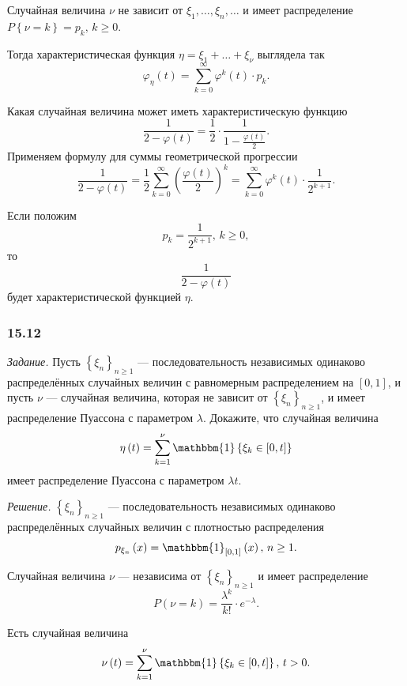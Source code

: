 \begin{enumerate}[label=\alph*)]
Случайная величина $ \nu $ не зависит от $ \xi_1, \dotsc, \xi_n, \dotsc $ и имеет распределение
$P \left\{ \nu = k \right\} = p_k, \,
  k \geq 0$.

Тогда характеристическая функция $ \eta = \xi_1 + \dotsc + \xi_{ \nu }$ выглядела так
$$ \varphi_{ \eta } \left( t \right) =
  \sum \limits_{k = 0}^{ \infty } \varphi^k \left( t \right) \cdot p_k.$$

Какая случайная величина может иметь характеристическую функцию
$$ \frac{1}{2 - \varphi \left( t \right) } =
  \frac{1}{2} \cdot \frac{1}{1 - \frac{ \varphi \left( t \right) }{2}}.$$
Применяем формулу для суммы геометрической прогрессии
$$ \frac{1}{2 - \varphi \left( t \right) } =
  \frac{1}{2}
  \sum \limits_{k = 0}^{ \infty } \left( \frac{ \varphi \left( t \right) }{2} \right)^k =
  \sum \limits_{k = 0}^{ \infty } \varphi^k \left( t \right) \cdot \frac{1}{2^{k+1}}.$$

Если положим
$$p_k = \frac{1}{2^{k+1}}, \,
  k \geq 0,$$
то
$$ \frac{1}{2 - \varphi \left( t \right) }$$
будет характеристической функцией $ \eta $.
\end{enumerate}

\subsubsection*{15.12}

\textit{Задание.}
Пусть $ \left\{ \xi_n \right\}_{n \geq 1}$ ---
последовательность независимых одинаково распределённых случайных величин с равномерным
распределением на $ \left[ 0, 1 \right] $, и пусть $ \nu $ --- случайная величина,
которая не зависит от $ \left\{ \xi_n \right\}_{n \geq 1}$,
и имеет распределение Пуассона с параметром $ \lambda $.
Докажите, что случайная величина
$$ \eta \left( t \right) =
  \sum \limits_{k = 1}^{ \nu } \mathbbm{1} \left\{ \xi_k \in \left[ 0, t \right] \right\} $$
имеет распределение Пуассона с параметром $ \lambda t$.

\textit{Решение.}
$ \left\{ \xi_n \right\}_{n \geq 1}$ ---
последовательность независимых одинаково распределённых случайных величин с плотностью распределения
$$p_{ \xi_n} \left( x \right) = \mathbbm{1}_{ \left[ 0, 1 \right] } \left( x \right), \,
  n \geq 1.$$

Случайная величина $ \nu $ ---
независима от $ \left\{ \xi_n \right\}_{n \geq 1}$ и имеет распределение
$$P \left( \nu = k \right) =
  \frac{ \lambda^k}{k!} \cdot e^{- \lambda }.$$

Есть случайная величина
$$ \nu \left( t \right) =
  \sum \limits_{k = 1}^{ \nu } \mathbbm{1} \left\{ \xi_k \in \left[ 0, t \right] \right\}, \,
  t > 0.$$

